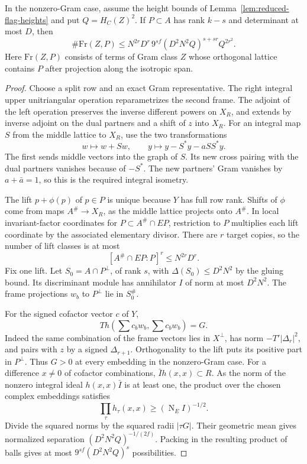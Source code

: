 \begin{proposition}\label{prop:integral-flag-frames}
In the nonzero-Gram case, assume the height bounds of
Lemma~\ref{lem:reduced-flag-heights} and put \(Q=H_C(Z)^2\). If \(P\subset A\) has rank
\(k-s\) and determinant at most \(D\), then
\[
 \#\mathrm{Fr}(Z,P)
 \le N^{2r}D^r\,9^{sf}(D^2N^2Q)^{s+sr}Q^{2r^2}.
\]
Here \(\mathrm{Fr}(Z,P)\) consists of terms of Gram class \(Z\)
whose orthogonal lattice contains \(P\) after projection along
the isotropic span.
\end{proposition}

\begin{proof}
Choose a split row and an exact Gram representative.
The right integral upper unitriangular operation
reparametrizes the second frame. The adjoint of the
left operation preserves the inverse different powers
on \(X_R\), and extends by inverse adjoint on the dual
partners and a shift of \(z\) into \(X_R\).
For an integral map \(S\) from the middle lattice to \(X_R\), use the two transformations
\[
    w\longmapsto w+Sw,\qquad
    y\longmapsto y-S^*y-aSS^*y .
\]
The first sends middle vectors into the graph of \(S\).
Its new cross pairing with the dual partners vanishes because
of \(-S^*\). The new partners' Gram vanishes by \(a+\bar a=1\),
so this is the required integral isometry.


The lift \(p+\phi(p)\) of \(p\in P\) is unique because
\(Y\) has full row rank. Shifts of \(\phi\) come from
maps \(A^\#\to X_R\), as the middle lattice projects
onto \(A^\#\). In local invariant-factor coordinates for \(P\subset A^\#\cap EP\),
restriction to \(P\) multiplies each lift coordinate by the associated
elementary divisor. There are \(r\) target copies, so the number of
lift classes is at most
\[
        [A^\#\cap EP:P]^r\le N^{2r}D^r .
\] Fix one lift. Let \(S_0=A\cap P^\perp\), of rank
\(s\), with \(\Delta(S_0)\leq D^2N^2\) by the gluing
bound. Its discriminant module has annihilator \(I\)
of norm at most \(D^2N^2\). The frame projections
\(w_b\) to \(P^\perp\) lie in \(S_0^\#\).

For the signed cofactor vector \(c\) of \(Y\),
\[
 T h\!\left(\sum c_bw_b,\sum c_bw_b\right)=G .
\]
Indeed the same combination of the frame vectors lies
in \(X^\perp\), has norm \(-T'|\Delta_r|^2\), and pairs
with \(z\) by a signed \(\Delta_{r+1}\).
Orthogonality to the lift puts its positive part in
\(P^\perp\). Thus \(G>0\) at every embedding in the
nonzero-Gram case. For a difference \(x\ne0\) of cofactor combinations,
\(\bar I h(x,x)\subset R\). As the norm of the nonzero integral
ideal \(h(x,x)\bar I\) is at least one, the product over the
chosen complex embeddings satisfies
\[
 \prod_\tau h_\tau(x,x)\ge (\operatorname N_E I)^{-1/2}.
\]
Divide the squared norms by the squared radii \(|\tau G|\).
Their geometric mean gives normalized separation
\((D^2N^2Q)^{-1/(2f)}\). Packing in the resulting product of
balls gives at most \(9^{sf}(D^2N^2Q)^s\) possibilities.


\end{proof}
